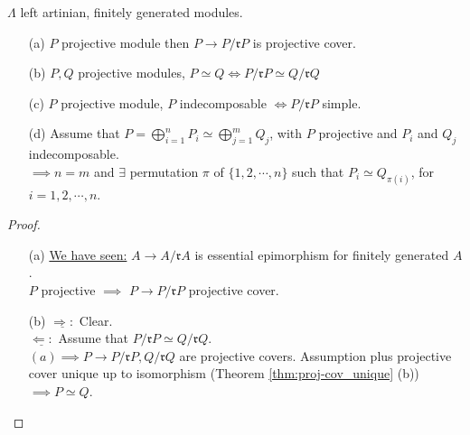 \begin{prop}
$\Lambda$ left artinian, finitely generated modules.
\begin{enumerate}
\item[(a)] $P$ projective module then $P \to P/\mathfrak{r}P$ is projective cover.
\item[(b)] $P,Q$ projective modules, $P \simeq Q \iff P/\mathfrak{r}P \simeq Q/\mathfrak{r}Q$
\item[(c)] $P$ projective module, $P$ indecomposable $\iff P/\mathfrak{r}P$ simple.
\item[(d)] Assume that $P = \bigoplus_{i=1}^n P_i \simeq \bigoplus_{j=1}^m Q_j$, with $P$ projective and $P_i$ and $Q_j$ indecomposable.\\
$\implies n = m$ and $\exists $ permutation $\pi$ of $\{ 1, 2, \cdots, n \}$ such that $P_i \simeq Q_{\pi(i)}$, for $i=1,2,\cdots,n$.
\end{enumerate}
\begin{proof}
\begin{enumerate}
\item[]
\item[(a)] \underline{We have seen:} $A \to A/\mathfrak{r}A$ is essential epimorphism for finitely generated $A$.\\
$P$ projective $\implies$ $P \to P/\mathfrak{r}P$ projective cover.

\item[(b)] $\underline{\Rightarrow :}$ Clear.\\
$\underline{\Leftarrow:}$ Assume that $P/\mathfrak{r}P \simeq Q/\mathfrak{r}Q$.\\
$(a) \implies P \to P/\mathfrak{r}P, Q/\mathfrak{r}Q$ are projective covers. Assumption plus projective cover unique up to isomorphism (Theorem \ref{thm:proj-cov_unique} (b)) $\implies P \simeq Q$.


\end{enumerate}
\end{proof}
\end{prop}
